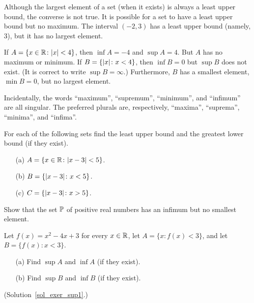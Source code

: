 \begin{exam}   Although the largest element of a set (when it exists) is always a least upper
bound, the converse is not true.  It is possible for a set to have a least upper bound but no
maximum.  The interval $(-2,3)$ has a least upper bound (namely, 3), but it has no largest
element.
\end{exam}

\begin{exam} If $A = \{x \in \mathbb{R} \colon \lvert x\rvert < 4\}$, then $\inf A = -4$ and $\sup A = 4$.
But $A$ has no maximum or minimum.  If $B = \{\lvert x\rvert \colon x < 4\}$, then $\inf B = 0$ but
$\sup B$ does not exist.  (It is correct to write $\sup B = \infty$.)  Furthermore, $B$ has a
smallest element, $\min B = 0$, but no largest element.
\end{exam}

Incidentally, the words ``maximum'', ``supremum'', ``minimum'', and ``infimum'' are all
singular.  The preferred plurals are, respectively, ``maxima'', ``suprema'', ``minima'', and
``infima''.

\begin{prob} For each of the following sets find the least upper bound and the greatest lower
bound (if they exist).
 \begin{enumerate}
  \item[(a)] $A = \{x \in \mathbb{R} \colon \lvert x - 3\rvert < 5\}$.
  \item[(b)] $B = \{\lvert x - 3\rvert \colon x < 5\}$.
  \item[(c)] $C = \{\lvert x - 3\rvert \colon x > 5\}$.
 \end{enumerate}
\end{prob}

\begin{prob} Show that the set $\mathbb{P}$ of positive real numbers has an infimum but no smallest
element.
\end{prob}

\begin{exer}\label{exer_sup1}  Let $f(x) = x^2 - 4x + 3$ for every $x \in \mathbb{R}$, let
$A = \{x \colon f(x) < 3\}$, and let $B = \{f(x) \colon x < 3\}$.
 \begin{enumerate}
  \item[(a)] Find $\sup A$ and $\inf A$ (if they exist).
  \item[(b)] Find $\sup B$ and $\inf B$ (if they exist).
 \end{enumerate}
(Solution~\ref{sol_exer_sup1}.)
\end{exer}


